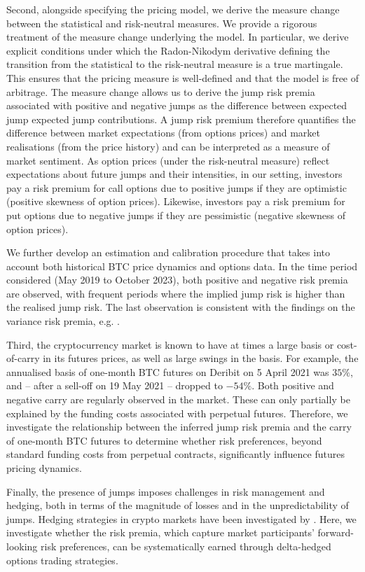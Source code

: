 \documentclass[11pt,a4paper]{article}
\numberwithin{equation}{section}
\theoremstyle{remark}
\theoremstyle{definition}
\begin{document}
Second, alongside specifying the pricing model, we derive the measure change between the statistical and risk-neutral measures. We provide a rigorous treatment of the measure change underlying the model. In particular, we derive explicit conditions under which the Radon-Nikodym derivative defining the transition from the statistical to the risk-neutral measure is a true martingale. This ensures that the pricing measure is well-defined and that the model is free of arbitrage. The measure change allows us to derive the jump risk premia associated with positive and negative jumps as the difference between expected jump expected jump contributions.
A jump risk premium therefore quantifies the difference between market expectations (from options prices) and market realisations (from the price history) and can be interpreted as a measure of market sentiment. As option prices (under the risk-neutral measure) reflect expectations about future jumps and their intensities, in our setting, investors pay a risk premium for call options due to positive jumps if they are optimistic (positive skewness of option prices). Likewise, investors pay a risk premium for put options due to negative jumps if they are pessimistic (negative skewness of option prices).

We further develop an estimation and calibration procedure that takes into account both historical BTC price dynamics and options data. In the time period considered (May 2019 to October 2023), both positive and negative risk premia are observed, with frequent periods where the implied jump risk is higher than the realised jump risk. The last observation is consistent with the findings on the variance risk premia, e.g. \citep{Carr2009,Granelli2016}.

Third, the cryptocurrency market is known to have at times a large basis or cost-of-carry in its futures prices, as well as large swings in the basis.
For example, the annualised basis of one-month BTC futures on Deribit on 5 April 2021 was $35\%$, and -- after a sell-off on 19 May 2021 -- dropped to $-54\%$.
Both positive and negative carry are regularly observed in the market.
These can only partially be explained by the funding costs associated with perpetual futures.
Therefore, we investigate the relationship between the inferred jump risk premia and the carry of one-month BTC futures to determine whether risk preferences, beyond standard funding costs from perpetual contracts, significantly influence futures pricing dynamics.

Finally, the presence of jumps imposes challenges in risk management and hedging, both in terms of the magnitude of losses and in the unpredictability of jumps. Hedging strategies in crypto markets have been investigated by \citep[e.g.][]{liu2023hedging,matic2023hedging,lucicsepp2024}. Here, we investigate whether the risk premia, which capture market participants' forward-looking risk preferences, can be systematically earned through delta-hedged options trading strategies.
\end{document}
